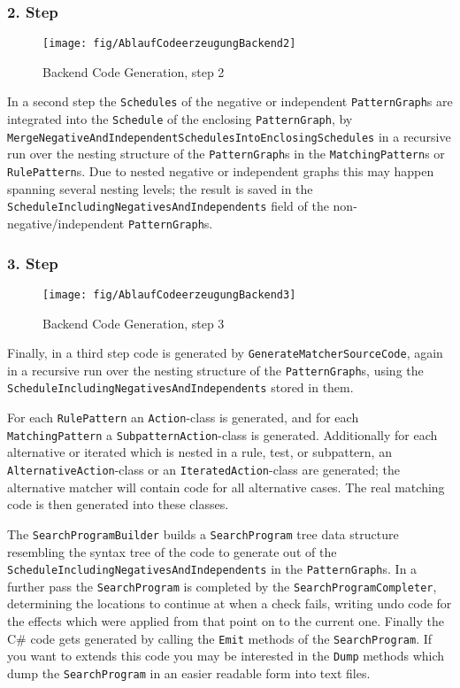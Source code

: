 \subsubsection*{2. Step}

\begin{figure}[htbp]
  \centering
  \texttt{[image: fig/AblaufCodeerzeugungBackend2]}
  \caption{Backend Code Generation, step 2}
  \label{figbackendcodegen2}
\end{figure}

In a second step the \texttt{Schedules} of the negative or independent \texttt{Pattern\-Graph}s are integrated into the \texttt{Schedule} of the enclosing \texttt{Pattern\-Graph}, by \texttt{Merge\-Negative\-And\-Independent\-Schedules\-Into\-Enclosing\-Schedules} in a recursive run over the nesting structure of the \texttt{Pattern\-Graph}s in the \texttt{Matching\-Pattern}s or \texttt{Rule\-Pattern}s.
Due to nested negative or independent graphs this may happen spanning several nesting levels;
the result is saved in the \texttt{Schedule\-Including\-Negatives\-And\-Independents} field of the non-negative/independent \texttt{Pattern\-Graph}s.


\subsubsection*{3. Step}

\begin{figure}[htbp]
  \centering
  \texttt{[image: fig/AblaufCodeerzeugungBackend3]}
  \caption{Backend Code Generation, step 3}
  \label{figbackendcodegen3}
\end{figure}

Finally, in a third step code is generated by \texttt{Generate\-Matcher\-Source\-Code},
again in a recursive run over the nesting structure of the \texttt{Pattern\-Graph}s, 
using the \texttt{Schedule\-Including\-Negatives\-And\-Independents} stored in them. 

For each \texttt{Rule\-Pattern} an \texttt{Action}-class is generated, 
and for each \texttt{Matching\-Pattern} a \texttt{Subpattern\-Action}-class is generated.
Additionally for each alternative or iterated which is nested in a rule, test, or subpattern,
an \texttt{Alternative\-Action}-class or an \texttt{Iterated\-Action}-class are generated;
the alternative matcher will contain code for all alternative cases.
The real matching code is then generated into these classes.

The \texttt{SearchProgramBuilder} builds a \texttt{SearchProgram} tree data structure resembling the syntax tree of the code to generate out of the \texttt{Schedule\-Including\-Negatives\-And\-Independents} in the \texttt{Pattern\-Graph}s. 
In a further pass the \texttt{SearchProgram} is completed by the \texttt{Search\-Program\-Completer},
determining the locations to continue at when a check fails,
writing undo code for the effects which were applied from that point on to the current one.
Finally the C\# code gets generated by calling the \texttt{Emit} methods of the \texttt{SearchProgram}.
If you want to extends this code you may be interested in the \texttt{Dump} methods which dump the \texttt{SearchProgram} in an easier readable form into text files.

